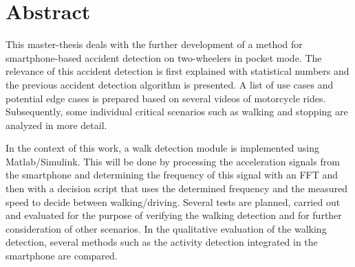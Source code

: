 \begingroup %
\let\cleardoublepage\relax
\chapter*{Abstract}
This master-thesis deals with the further development of a method for smartphone-based accident detection on two-wheelers in pocket mode.
The relevance of this accident detection is first explained with statistical numbers and the previous accident detection algorithm is presented.
A list of use cases and potential edge cases is prepared based on several videos of motorcycle rides. Subsequently, some individual critical scenarios such as walking and stopping are analyzed in more detail.

In the context of this work, a walk detection module is implemented using Matlab/Simulink. This will be done by processing the acceleration signals from the smartphone and determining the frequency of this signal with an FFT and then with a decision script that uses the determined frequency and the measured speed to decide between walking/driving.
Several tests are planned, carried out and evaluated for the purpose of verifying the walking detection and for further consideration of other scenarios.
In the qualitative evaluation of the walking detection, several methods such as the activity detection integrated in the smartphone are compared.

\endgroup
\cleardoublepage
